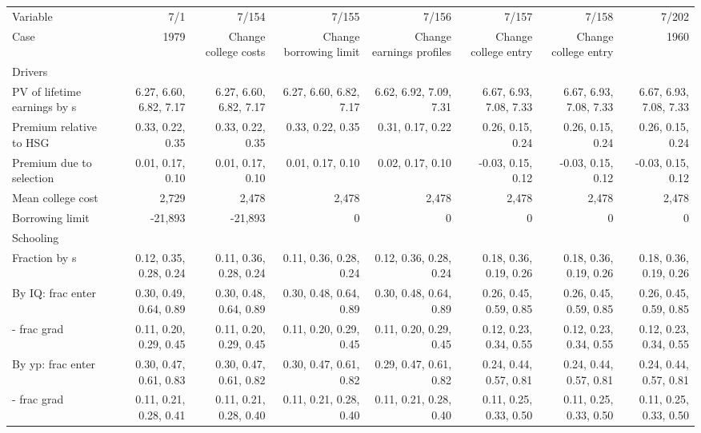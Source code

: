 \begin{tabular}{lrrrrrrr}
\hline
Variable & 7/1  & 7/154  & 7/155  & 7/156  & 7/157  & 7/158  & 7/202  \\ 
Case & 1979  & Change college costs  & Change borrowing limit  & Change earnings profiles  & Change college entry  & Change college entry  & 1960  \\ 
Drivers &   &   &   &   &   &   &   \\ 
PV of lifetime earnings by s & 6.27, 6.60, 6.82, 7.17  & 6.27, 6.60, 6.82, 7.17  & 6.27, 6.60, 6.82, 7.17  & 6.62, 6.92, 7.09, 7.31  & 6.67, 6.93, 7.08, 7.33  & 6.67, 6.93, 7.08, 7.33  & 6.67, 6.93, 7.08, 7.33  \\ 
Premium relative to HSG & 0.33, 0.22, 0.35  & 0.33, 0.22, 0.35  & 0.33, 0.22, 0.35  & 0.31, 0.17, 0.22  & 0.26, 0.15, 0.24  & 0.26, 0.15, 0.24  & 0.26, 0.15, 0.24  \\ 
Premium due to selection & 0.01, 0.17, 0.10  & 0.01, 0.17, 0.10  & 0.01, 0.17, 0.10  & 0.02, 0.17, 0.10  & -0.03, 0.15, 0.12  & -0.03, 0.15, 0.12  & -0.03, 0.15, 0.12  \\ 
Mean college cost & 2,729  & 2,478  & 2,478  & 2,478  & 2,478  & 2,478  & 2,478  \\ 
Borrowing limit & -21,893  & -21,893  & 0  & 0  & 0  & 0  & 0  \\ 
\hline
Schooling &   &   &   &   &   &   &   \\ 
Fraction by s & 0.12, 0.35, 0.28, 0.24  & 0.11, 0.36, 0.28, 0.24  & 0.11, 0.36, 0.28, 0.24  & 0.12, 0.36, 0.28, 0.24  & 0.18, 0.36, 0.19, 0.26  & 0.18, 0.36, 0.19, 0.26  & 0.18, 0.36, 0.19, 0.26  \\ 
By IQ: frac enter & 0.30, 0.49, 0.64, 0.89  & 0.30, 0.48, 0.64, 0.89  & 0.30, 0.48, 0.64, 0.89  & 0.30, 0.48, 0.64, 0.89  & 0.26, 0.45, 0.59, 0.85  & 0.26, 0.45, 0.59, 0.85  & 0.26, 0.45, 0.59, 0.85  \\ 
- frac grad & 0.11, 0.20, 0.29, 0.45  & 0.11, 0.20, 0.29, 0.45  & 0.11, 0.20, 0.29, 0.45  & 0.11, 0.20, 0.29, 0.45  & 0.12, 0.23, 0.34, 0.55  & 0.12, 0.23, 0.34, 0.55  & 0.12, 0.23, 0.34, 0.55  \\ 
By yp: frac enter & 0.30, 0.47, 0.61, 0.83  & 0.30, 0.47, 0.61, 0.82  & 0.30, 0.47, 0.61, 0.82  & 0.29, 0.47, 0.61, 0.82  & 0.24, 0.44, 0.57, 0.81  & 0.24, 0.44, 0.57, 0.81  & 0.24, 0.44, 0.57, 0.81  \\ 
- frac grad & 0.11, 0.21, 0.28, 0.41  & 0.11, 0.21, 0.28, 0.40  & 0.11, 0.21, 0.28, 0.40  & 0.11, 0.21, 0.28, 0.40  & 0.11, 0.25, 0.33, 0.50  & 0.11, 0.25, 0.33, 0.50  & 0.11, 0.25, 0.33, 0.50  \\ 

\end{tabular}
